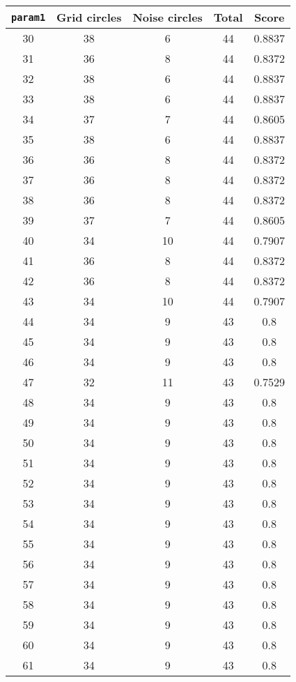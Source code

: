 \documentclass[letterpaper, 12pt]{article}
\begin{document}
\begin{longtable}{|c|c|c|c|c|}
\hline
\textbf{\texttt{param1}} & \textbf{Grid circles} & \textbf{Noise circles} & \textbf{Total} & \textbf{Score} \\
\hline
30 & 38 & 6 & 44 & 0.8837 \\
\hline
31 & 36 & 8 & 44 & 0.8372 \\
\hline
32 & 38 & 6 & 44 & 0.8837 \\
\hline
33 & 38 & 6 & 44 & 0.8837 \\
\hline
34 & 37 & 7 & 44 & 0.8605 \\
\hline
35 & 38 & 6 & 44 & 0.8837 \\
\hline
36 & 36 & 8 & 44 & 0.8372 \\
\hline
37 & 36 & 8 & 44 & 0.8372 \\
\hline
38 & 36 & 8 & 44 & 0.8372 \\
\hline
39 & 37 & 7 & 44 & 0.8605 \\
\hline
40 & 34 & 10 & 44 & 0.7907 \\
\hline
41 & 36 & 8 & 44 & 0.8372 \\
\hline
42 & 36 & 8 & 44 & 0.8372 \\
\hline
43 & 34 & 10 & 44 & 0.7907 \\
\hline
44 & 34 & 9 & 43 & 0.8 \\
\hline
45 & 34 & 9 & 43 & 0.8 \\
\hline
46 & 34 & 9 & 43 & 0.8 \\
\hline
47 & 32 & 11 & 43 & 0.7529 \\
\hline
48 & 34 & 9 & 43 & 0.8 \\
\hline
49 & 34 & 9 & 43 & 0.8 \\
\hline
50 & 34 & 9 & 43 & 0.8 \\
\hline
51 & 34 & 9 & 43 & 0.8 \\
\hline
52 & 34 & 9 & 43 & 0.8 \\
\hline
53 & 34 & 9 & 43 & 0.8 \\
\hline
54 & 34 & 9 & 43 & 0.8 \\
\hline
55 & 34 & 9 & 43 & 0.8 \\
\hline
56 & 34 & 9 & 43 & 0.8 \\
\hline
57 & 34 & 9 & 43 & 0.8 \\
\hline
58 & 34 & 9 & 43 & 0.8 \\
\hline
59 & 34 & 9 & 43 & 0.8 \\
\hline
60 & 34 & 9 & 43 & 0.8 \\
\hline
61 & 34 & 9 & 43 & 0.8 \\

\end{longtable}
\end{document}
